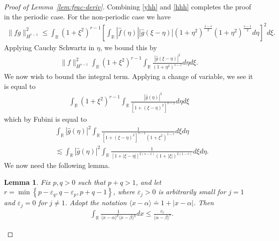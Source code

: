 \documentclass[12pt,reqno]{amsart}
\numberwithin{equation}{section}  %
\numberwithin{figure}{section}
\newcommand{\rr}{\mathbb{R}}
\newcommand{\wh}{\widehat}
\newcommand{\ee}{\varepsilon}
\newtheorem{lemma}{Lemma}
\begin{document}
\begin{proof}[Proof of Lemma~\ref{lem:frac-deriv}]
%
Combining \eqref{yhh} and \eqref{hhh} completes the proof in the periodic
case. For the non-periodic case we have
%
%
\begin{equation*}
\begin{split}
\| fg\|_{H^{r-1}}^{2}
\le \int_{\rr}  (1 + \xi^{2})^{r-1}\left [ \int_{\rr}
| \wh{f}(\eta) |  | \wh{g}(\xi - \eta) | (1 +
\eta^{2})^{\frac{1-s}{2}} (1 + \eta^{2})^{\frac{s-1}{2}}
d \eta \right ]^{2} d \xi.
\end{split}
\end{equation*}
%
Applying Cauchy Schwartz in $\eta$, we bound this by
%
%
%
\begin{equation*}
\begin{split}
\| f \|_{H^{s-1}}^{2} \int_{\rr}  (1 + \xi^{2})^{r-1}\int_{\rr} \frac{|
\wh{g}(\xi - \eta) |^{2}}{(1 + \eta^{2})^{s-1}} d \eta d \xi.
\end{split}
\end{equation*}
%
We now wish to bound the integral term. Applying a change of variable, we see it
is equal to
%
\begin{equation*}
\begin{split}
\int_{\rr} (1 + \xi^{2})^{r-1} \int_{\rr}
\frac{| \wh{g}(\eta) |^{2}}{[1 + (\xi - \eta)^{2}]^{s-1}} d \eta d \xi
\end{split}
\end{equation*}
which by Fubini is equal to
%
%
\begin{equation}
\label{int-pre-calc-lem}
\begin{split}
& \int_{\rr} | \wh{g}(\eta) |^{2} \int_{\rr} \frac{1}{\left[
1 + (\xi - \eta)^{2} \right]^{s-1} (1 + \xi^{2})^{1-r}} d \xi d \eta
\\
& \lesssim \int_{\rr} | \wh{g}(\eta) |^{2} \int_{\rr} \frac{1}{\left[
1 + |\xi - \eta| \right]^{2(s-1)} (1 + |\xi|)^{2(1-r)}} d \xi d \eta.
\end{split}
\end{equation}
%
%
We now need the following lemma. 
%
%
\begin{lemma}
\label{lem:calc}
%
Fix $p, q > 0$ such that $p +q >1$, and let $r =\min\left\{p - \ee_{q}, q -
\ee_{p}, p+q-1 \right\}$, where $\ee_{j} > 0$ is arbitrarily small for $j = 1$
and $\ee_{j} = 0$ for $j \neq 1$. Adopt the notation
$\langle x - \alpha \rangle  \doteq 1 + | x - \alpha |$. Then 
%
\begin{equation*}
\begin{split}
& \int_{\rr} \frac{1}{\langle x - \alpha \rangle ^{p} \langle x -
\beta \rangle
^{q}} d x
\le \frac{c_{r}}{\langle \alpha - \beta \rangle ^{r}}. 

\end{split}
\end{equation*}
\end{lemma}
\end{proof}
\end{document}
